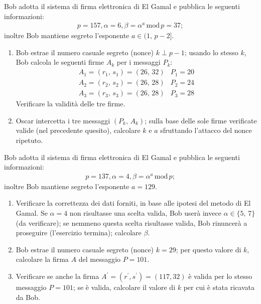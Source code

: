         Bob adotta il sistema di firma elettronica di El Gamal e pubblica le seguenti informazioni:
        \begin{gather*}
            p=157, \alpha = 6, \beta = \alpha^a\,\mathrm{mod}\,p=37
        ;\end{gather*}
        inoltre Bob mantiene segreto l'esponente $a\in (1,\,p-2]$.
        \begin{enumerate}
            \item Bob estrae il numero casuale segreto (nonce) $k\perp p-1$; usando lo stesso $k$, 
                Bob calcola le seguenti firme $A_k$ per i messaggi $P_k$:
                \[\begin{array}{ll}
                    A_1=(r_1,\,s_1)=(26,\,32) & P_1=20\\
                    A_2=(r_2,\,s_2)=(26,\,28) & P_2=24\\
                    A_3=(r_3,\,s_3)=(26,\,28) & P_3=28
                \end{array}\]
                Verificare la validità delle tre firme.
            \item Oscar intercetta i tre messaggi $(P_k,\,A_k)$; sulla base delle sole firme verificate valide 
                (nel precedente quesito), calcolare $k$ e $a$ sfruttando l'attacco del nonce ripetuto.
        \end{enumerate}

        Bob adotta il sistema di firma elettronica di El Gamal e pubblica le seguenti informazioni:
        \begin{gather*}
            p=137, \alpha = 4, \beta = \alpha^a\,\mathrm{mod}\,p
        ;\end{gather*}
        inoltre Bob mantiene segreto l'esponente $a=129$.
        \begin{enumerate}
            \item Verificare la correttezza dei dati forniti, in base alle ipotesi del metodo di El Gamal. 
                Se $\alpha=4$ non risultasse una scelta valida, Bob userà invece $\alpha\in \{5,\,7\}$ 
                (da verificare); se nemmeno questa scelta risultasse valida, Bob rinuncerà a proseguire 
                (l'esercizio termina); calcolare $\beta$.
            \item Bob estrae il numero casuale segreto (nonce) $k=29$; per questo valore di $k$, calcolare 
                la firma $A$ del messaggio $P=101$.
            \item Verificare se anche la firma $A^{\prime}=(r^{\prime}, s^{\prime})=(117,32)$ è valida per 
                lo stesso messaggio $P=101$; se è valida, calcolare il valore di $k$ per cui è stata ricavata da Bob.
        \end{enumerate}

